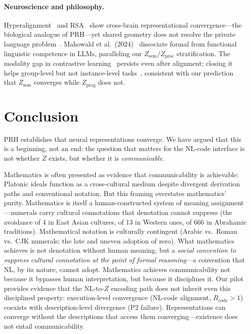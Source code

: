 \documentclass{article}
\theoremstyle{definition}
\newcommand{\Zsem}{Z_{\text{sem}}}
\newcommand{\Zproc}{Z_{\text{proc}}}
\newcommand{\Zprag}{Z_{\text{prag}}}
\begin{document}
\paragraph{Neuroscience and philosophy.}
Hyperalignment~\citep{haxby2011hyperalignment} and RSA~\citep{kriegeskorte2008rsa} show cross-brain representational convergence---the biological analogue of PRH---yet shared geometry does not resolve the private language problem~\citep{wittgenstein1953}. Mahowald et al.\ (2024)~\citep{mahowald2024dissociating} dissociate formal from functional linguistic competence in LLMs, paralleling our $\Zsem$/$\Zproc$ stratification. The modality gap in contrastive learning~\citep{liang2022modalitygap} persists even after alignment; closing it helps group-level but not instance-level tasks~\citep{grassucci2026modgap}, consistent with our prediction that $\Zsem$ converges while $\Zprag$ does not.


\section{Conclusion}

PRH establishes that neural representations converge. We have argued that this is a beginning, not an end: the question that matters for the NL-code interface is not whether $Z$ exists, but whether it is \emph{communicable}.

Mathematics is often presented as evidence that communicability is achievable: Platonic ideals function as a cross-cultural medium despite divergent derivation paths and conventional notation. But this framing overstates mathematics' purity. Mathematics is itself a human-constructed system of meaning assignment---numerals carry cultural connotations that denotation cannot suppress (the avoidance of 4 in East Asian cultures, of 13 in Western ones, of 666 in Abrahamic traditions). Mathematical notation is culturally contingent (Arabic vs.\ Roman vs.\ CJK numerals; the late and uneven adoption of zero). What mathematics achieves is not denotation without human meaning, but a \emph{social convention to suppress cultural connotation at the point of formal reasoning}---a convention that NL, by its nature, cannot adopt. Mathematics achieves communicability not because it bypasses human interpretation, but because it disciplines it. Our pilot provides evidence that the NL-to-$Z$ encoding path does not inherit even this disciplined property: execution-level convergence (NL-code alignment, $R_{\text{code}} > 1$) coexists with description-level divergence (P2 failure). Representations can converge without the descriptions that access them converging---existence does not entail communicability.
\end{document}
